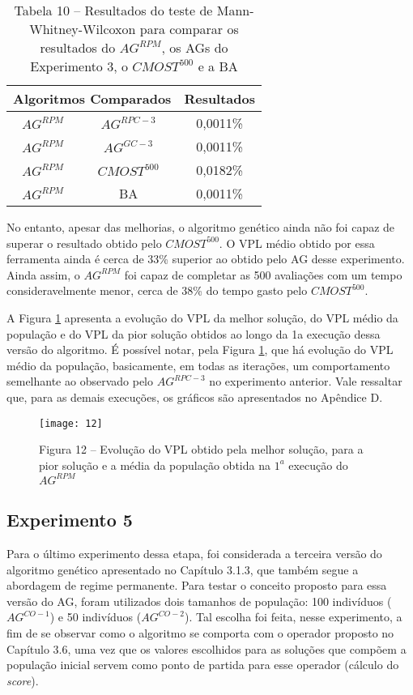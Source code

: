 \begin{table}[H]
\centering
\caption{Tabela 10 – Resultados do teste de Mann-Whitney-Wilcoxon para comparar os resultados do $AG^{RPM}$, os AGs do Experimento 3, o $CMOST^500$ e a BA}
\label{tab:mw4_1}
\begin{tabular}{|c|c|c|}
\hline
\multicolumn{2}{|c|}{Algoritmos Comparados} & Resultados \\ \hline
$AG^{RPM}$ & $AG^{RPC-3}$ & 0,0011\% \\ \hline
$AG^{RPM}$ & $AG^{GC-3}$ & 0,0011\% \\ \hline
$AG^{RPM}$ & $CMOST^500$ & 0,0182\% \\ \hline
$AG^{RPM}$ & BA & 0,0011\% \\ \hline


\end{tabular}
\end{table}

No entanto, apesar das melhorias, o algoritmo genético ainda não foi capaz de superar o resultado obtido pelo $CMOST^{500}$. O VPL médio obtido por essa ferramenta ainda é cerca de 33\% superior ao obtido pelo AG desse experimento. Ainda assim, o $AG^{RPM}$ foi capaz de completar as 500 avaliações com um tempo consideravelmente menor, cerca de 38\% do tempo gasto pelo $CMOST^{500}$.

A Figura \ref{fig:graph4_1} apresenta a evolução do VPL da melhor solução, do VPL médio da população e do VPL da pior solução obtidos ao longo da 1a execução dessa versão do algoritmo. É possível notar, pela Figura \ref{fig:graph4_1}, que há evolução do VPL médio da população, basicamente, em todas as iterações, um comportamento semelhante ao observado pelo $AG^{RPC-3}$ no experimento anterior. Vale ressaltar que, para as demais execuções, os gráficos são apresentados no Apêndice D.

\begin{figure}[H]
\centering

\texttt{[image: 12]}

\caption{Figura 12  – Evolução do VPL obtido pela melhor solução, para a pior solução e a média da população obtida na $1^a$ execução do $AG^{RPM}$}
\label{fig:graph4_1}
\end{figure}

\subsection{Experimento 5}

Para o último experimento dessa etapa, foi considerada a terceira versão do algoritmo genético apresentado no Capítulo 3.1.3, que também segue a abordagem de regime permanente. Para testar o conceito proposto para essa versão do AG, foram utilizados dois tamanhos de população: 100 indivíduos ($AG^{CO-1}$) e 50 indivíduos ($AG^{CO-2}$). Tal escolha foi feita, nesse experimento, a fim de se observar como o algoritmo se comporta com o operador proposto no Capítulo 3.6, uma vez que os valores escolhidos para as soluções que compõem a população inicial servem como ponto de partida para esse operador (cálculo do \textit{score}).

